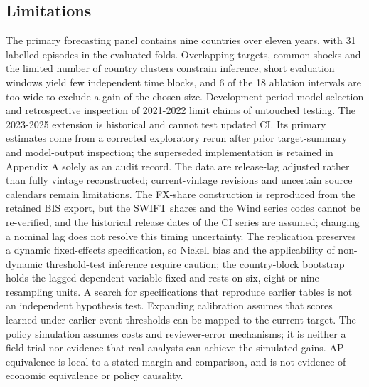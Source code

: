 \documentclass[preprint,12pt,authoryear]{elsarticle}
\begin{document}
\subsection{Limitations}
The primary forecasting panel contains nine countries over eleven years, with 31 labelled episodes in the evaluated folds. Overlapping targets, common shocks and the limited number of country clusters constrain inference; short evaluation windows yield few independent time blocks, and 6 of the 18 ablation intervals are too wide to exclude a gain of the chosen size. Development-period model selection and retrospective inspection of 2021-2022 limit claims of untouched testing. The 2023-2025 extension is historical and cannot test updated CI. Its primary estimates come from a corrected exploratory rerun after prior target-summary and model-output inspection; the superseded implementation is retained in Appendix A solely as an audit record. The data are release-lag adjusted rather than fully vintage reconstructed; current-vintage revisions and uncertain source calendars remain limitations. The FX-share construction is reproduced from the retained BIS export, but the SWIFT shares and the Wind series codes cannot be re-verified, and the historical release dates of the CI series are assumed; changing a nominal lag does not resolve this timing uncertainty. The replication preserves a dynamic fixed-effects specification, so Nickell bias \citep{nickell1981} and the applicability of non-dynamic threshold-test inference require caution; the country-block bootstrap holds the lagged dependent variable fixed and rests on six, eight or nine resampling units. A search for specifications that reproduce earlier tables is not an independent hypothesis test. Expanding calibration assumes that scores learned under earlier event thresholds can be mapped to the current target. The policy simulation assumes costs and reviewer-error mechanisms; it is neither a field trial nor evidence that real analysts can achieve the simulated gains. AP equivalence is local to a stated margin and comparison, and is not evidence of economic equivalence or policy causality.
\end{document}
